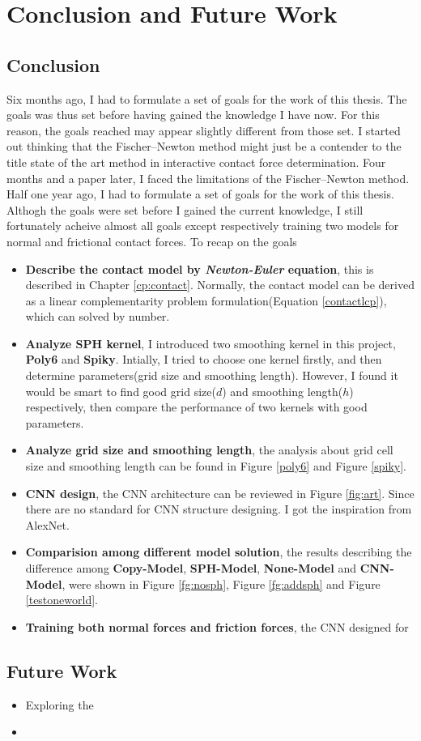 \chapter{Conclusion and Future Work}

\section{Conclusion}
Six months ago, I had to formulate a set of goals for the work of this thesis. The goals was thus set before having gained the knowledge I have now. For this reason, the goals reached may appear slightly different from those set. I started out thinking that the Fischer–Newton method might just be a contender to the title state of the art method in interactive contact force determination. Four months and a paper later, I faced the limitations of the Fischer–Newton method. \\

Half one year ago, I had to formulate a set of goals for the work of this thesis. Althogh the goals were set before I gained the current knowledge, I still fortunately acheive almost all goals except respectively training two models for normal and frictional contact forces. To recap on the goals
\begin{itemize}
    \item \textbf{Describe the contact model by \textit{Newton-Euler} equation}, this is described in Chapter \ref{cp:contact}. Normally, the contact model can be derived as a linear complementarity problem formulation(Equation \ref{contactlcp}), which can solved by number.
    \item \textbf{Analyze SPH kernel}, I introduced two smoothing kernel in this project, \textbf{Poly6} and \textbf{Spiky}. Intially, I tried to choose one kernel firstly, and then determine parameters(grid size and smoothing length). However, I found it would be smart to find good grid size($d$) and smoothing length($h$) respectively, then compare the performance of two kernels with good parameters.  
    \item \textbf{Analyze grid size and smoothing length}, the analysis about grid cell size and smoothing length can be found in Figure \ref{poly6} and Figure \ref{spiky}.
    \item \textbf{CNN design}, the CNN architecture can be reviewed in Figure \ref{fig:art}. Since there are no standard for CNN structure designing. I got the inspiration from AlexNet.
    \item \textbf{Comparision among different model solution}, the results describing the difference among \textbf{Copy-Model}, \textbf{SPH-Model}, \textbf{None-Model} and \textbf{CNN-Model}, were shown in Figure \ref{fg:nosph}, Figure \ref{fg:addsph} and Figure \ref{testoneworld}.
    \item \textbf{Training both normal forces and friction forces}, the CNN designed for 
\end{itemize}

\section{Future Work}

\begin{itemize}
    \item Exploring the  
    \item
\end{itemize}